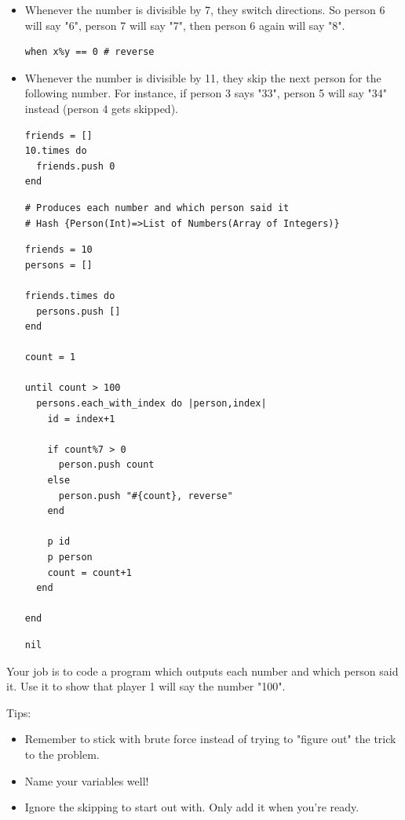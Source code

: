 \documentclass[11pt]{article}
\begin{document}
\begin{itemize}
\item Whenever the number is divisible by 7, they switch directions. So person 6 
will say "6", person 7 will say "7", then person 6 again will say "8".

\begin{verbatim}
when x%y == 0 # reverse
\end{verbatim}

\item Whenever the number is divisible by 11, they skip the next person for the 
following number. For instance, if person 3 says "33", person 5 will say 
"34" instead (person 4 gets skipped).

\begin{verbatim}
friends = []
10.times do 
  friends.push 0
end
\end{verbatim}

\begin{verbatim}
# Produces each number and which person said it
# Hash {Person(Int)=>List of Numbers(Array of Integers)}
\end{verbatim}

\begin{verbatim}
friends = 10
persons = []

friends.times do
  persons.push []
end

count = 1

until count > 100
  persons.each_with_index do |person,index|
    id = index+1

    if count%7 > 0
      person.push count
    else
      person.push "#{count}, reverse"
    end

    p id
    p person
    count = count+1
  end

end
\end{verbatim}

\begin{verbatim}
nil
\end{verbatim}
\end{itemize}


Your job is to code a program which outputs each number and which person said 
it. Use it to show that  player 1 will say the number "100".

Tips:

\begin{itemize}
\item Remember to stick with brute force instead of trying to "figure out" the 
trick to the problem.
\item Name your variables well!
\item Ignore the skipping to start out with. Only add it when you're ready.
\end{itemize}
\end{document}
